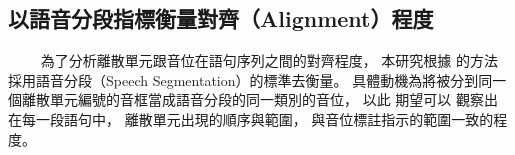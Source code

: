 
\subsection{以語音分段指標衡量對齊（Alignment）程度}
　　
為了分析離散單元跟音位在語句序列之間的對齊程度，
本研究根據 \cite{strgar_phoneme_2023} 的方法
採用語音分段（Speech Segmentation）的標準去衡量。
具體動機為將被分到同一個離散單元編號的音框當成語音分段的同一類別的音位，
以此
期望可以
觀察出
在每一段語句中，
離散單元出現的順序與範圍，
與音位標註指示的範圍一致的程度。

